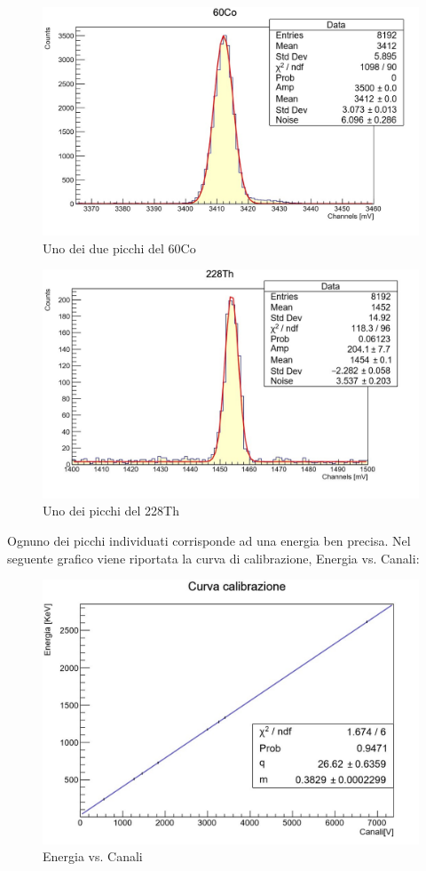 \documentclass[a4paper,10pt]{article}
\begin{document}
\begin{figure}[H]
    \centering
    \includegraphics[scale=0.7]{grafici/piccoCo}
    \caption{Uno dei due picchi del 60Co}
\end{figure}

\begin{figure}[H]
    \centering
    \includegraphics[scale=0.7]{grafici/piccoTh}
    \caption{Uno dei picchi del 228Th}
\end{figure}

\noindent Ognuno dei picchi individuati corrisponde ad una energia ben precisa. Nel seguente grafico viene riportata la curva di calibrazione, Energia vs. Canali:

\begin{figure}[H]
    \centering
    \includegraphics[scale=0.45]{grafici/rettacalibrazionesources}
    \caption{Energia vs. Canali}
\end{figure}
\end{document}
